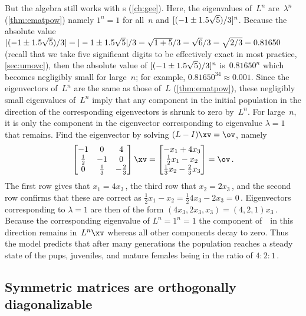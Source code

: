 \begin{example}
\begin{solution}
But the algebra still works with s (\cref{ch:gee}).
Here, the eigenvalues of~\(L^n\) are~\(\lambda^n\) (\cref{thm:ematpow}) namely \(1^n=1\) for all~\(n\) and \([(-1\pm 1.5\sqrt5)/3]^n\).
Because the absolute value \(|(-1\pm 1.5\sqrt5)/3|
=|-1\pm 1.5\sqrt5|/3=\sqrt{1+5}/3=\sqrt{6}/3=\sqrt{2/3}=0.81650\) (recall that we take five significant digits to be effectively exact in most practice, \cref{sec:umovc}), then the absolute value of \([(-1\pm 1.5\sqrt5)/3]^n\) is~\(0.81650^n\) which becomes negligibly small for large~\(n\); for example, \(0.81650^{34}\approx 0.001\).
Since the eigenvectors of~\(L^n\) are the same as those of~\(L\) (\cref{thm:ematpow}), these negligibly small eigenvalues of~\(L^n\) imply that any component in the initial population in the direction of the corresponding eigenvectors is shrunk to zero by~\(L^n\).
For large~\(n\), it is only the component in the eigenvector corresponding to eigenvalue \(\lambda=1\) that remains.
Find the eigenvector by solving \((L-I)\xv=\ov\), namely
\begin{equation*}
\begin{bmatrix} -1&0&4\\\frac12&-1&0\\0&\frac13&-\frac23 \end{bmatrix}\xv=\begin{bmatrix} -x_1+4x_3\\ \frac12x_1-x_2\\\frac13x_2-\frac23x_3 \end{bmatrix}=\ov\,.
\end{equation*}
The first row gives that \(x_1=4x_3\)\,, the third row that \(x_2=2x_3\)\,, and the second row confirms that these are correct as \(\frac12x_1-x_2=\frac124x_3-2x_3=0\)\,.
Eigenvectors corresponding to \(\lambda=1\) are then of the form \((4x_3,2x_3,x_3)=(4,2,1)x_3\)\,.
Because the corresponding eigenvalue of \(L^n=1^n=1\) the component of~\xv\ in this direction remains in~\(L^n\xv\) whereas all other components decay to zero.
Thus the model predicts that after many generations the population reaches a steady state of the pups, juveniles, and mature females being in the ratio of \(4:2:1\)\,.
\end{solution}
\end{example}





\subsection{Symmetric matrices are orthogonally diagonalizable}
\label{sec:smod}

